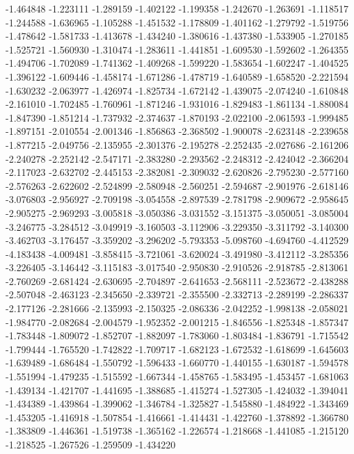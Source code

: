 -1.464848
-1.223111
-1.289159
-1.402122
-1.199358
-1.242670
-1.263691
-1.118517
-1.244588
-1.636965
-1.105288
-1.451532
-1.178809
-1.401162
-1.279792
-1.519756
-1.478642
-1.581733
-1.413678
-1.434240
-1.380616
-1.437380
-1.533905
-1.270185
-1.525721
-1.560930
-1.310474
-1.283611
-1.441851
-1.609530
-1.592602
-1.264355
-1.494706
-1.702089
-1.741362
-1.409268
-1.599220
-1.583654
-1.602247
-1.404525
-1.396122
-1.609446
-1.458174
-1.671286
-1.478719
-1.640589
-1.658520
-2.221594
-1.630232
-2.063977
-1.426974
-1.825734
-1.672142
-1.439075
-2.074240
-1.610848
-2.161010
-1.702485
-1.760961
-1.871246
-1.931016
-1.829483
-1.861134
-1.880084
-1.847390
-1.851214
-1.737932
-2.374637
-1.870193
-2.022100
-2.061593
-1.999485
-1.897151
-2.010554
-2.001346
-1.856863
-2.368502
-1.900078
-2.623148
-2.239658
-1.877215
-2.049756
-2.135955
-2.301376
-2.195278
-2.252435
-2.027686
-2.161206
-2.240278
-2.252142
-2.547171
-2.383280
-2.293562
-2.248312
-2.424042
-2.366204
-2.117023
-2.632702
-2.445153
-2.382081
-2.309032
-2.620826
-2.795230
-2.577160
-2.576263
-2.622602
-2.524899
-2.580948
-2.560251
-2.594687
-2.901976
-2.618146
-3.076803
-2.956927
-2.709198
-3.054558
-2.897539
-2.781798
-2.909672
-2.958645
-2.905275
-2.969293
-3.005818
-3.050386
-3.031552
-3.151375
-3.050051
-3.085004
-3.246775
-3.284512
-3.049919
-3.160503
-3.112906
-3.229350
-3.311792
-3.140300
-3.462703
-3.176457
-3.359202
-3.296202
-5.793353
-5.098760
-4.694760
-4.412529
-4.183438
-4.009481
-3.858415
-3.721061
-3.620024
-3.491980
-3.412112
-3.285356
-3.226405
-3.146442
-3.115183
-3.017540
-2.950830
-2.910526
-2.918785
-2.813061
-2.760269
-2.681424
-2.630695
-2.704897
-2.641653
-2.568111
-2.523672
-2.438288
-2.507048
-2.463123
-2.345650
-2.339721
-2.355500
-2.332713
-2.289199
-2.286337
-2.177126
-2.281666
-2.135993
-2.150325
-2.086336
-2.042252
-1.998138
-2.058021
-1.984770
-2.082684
-2.004579
-1.952352
-2.001215
-1.846556
-1.825348
-1.857347
-1.783448
-1.809072
-1.852707
-1.882097
-1.783060
-1.803484
-1.836791
-1.715542
-1.799444
-1.765520
-1.742822
-1.709717
-1.682123
-1.672532
-1.618699
-1.645603
-1.639489
-1.686484
-1.550792
-1.596433
-1.660770
-1.440155
-1.630187
-1.594578
-1.551994
-1.479235
-1.515592
-1.667344
-1.458765
-1.583495
-1.453457
-1.681063
-1.439134
-1.421707
-1.441695
-1.388685
-1.415274
-1.527305
-1.424032
-1.394041
-1.434389
-1.439864
-1.399062
-1.346784
-1.325827
-1.545880
-1.484922
-1.343469
-1.453205
-1.416918
-1.507854
-1.416661
-1.414431
-1.422760
-1.378892
-1.366780
-1.383809
-1.446361
-1.519738
-1.365162
-1.226574
-1.218668
-1.441085
-1.215120
-1.218525
-1.267526
-1.259509
-1.434220
